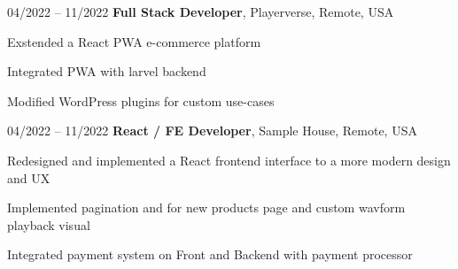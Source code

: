 \begin{twocolentry}{
    04/2022 – 11/2022
}
\textbf{Full Stack Developer}, Playerverse, Remote, USA\end{twocolentry}

\vspace{0.10 cm}
\begin{onecolentry}
   \begin{highlights}
       \item Exstended a React PWA e-commerce platform
       \item Integrated PWA with larvel backend
       \item Modified WordPress plugins for custom use-cases
   \end{highlights}
\end{onecolentry}


\begin{twocolentry}{
    04/2022 – 11/2022
}
\textbf{React / FE Developer}, Sample House, Remote, USA\end{twocolentry}

\vspace{0.10 cm}
\begin{onecolentry}
   \begin{highlights}
       \item Redesigned and implemented  a React frontend interface to a more modern design and UX
       \item Implemented pagination and for new products page and custom wavform playback visual
       \item Integrated payment system on Front and Backend with payment processor 
   \end{highlights}
\end{onecolentry}
